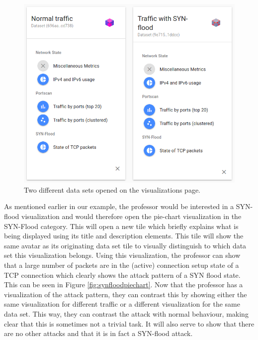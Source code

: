 \begin{figure}
    \centering
    \includegraphics[width=13cm]{images/evaluation-dataset-tiles.png}
    \caption{Two different data sets opened on the visualizations page.}
    \label{fig:datasettiles}
\end{figure}
As mentioned earlier in our example, the professor would be interested in a SYN-flood visualization and would therefore open the pie-chart visualization in the SYN-Flood category. This will open a new tile which briefly explains what is being displayed using its title and description elements. This tile will show the same avatar as its originating data set tile to visually distinguish to which data set this visualization belongs. Using this visualization, the professor can show that a large number of packets are in the (active) connection setup state of a TCP connection which clearly shows the attack pattern of a SYN flood state. This can be seen in Figure \ref{fig:synfloodpiechart}. Now that the professor has a visualization of the attack pattern, they can contrast this by showing either the same visualization for different traffic or a different visualization for the same data set. This way, they can contrast the attack with normal behaviour, making clear that this is sometimes not a trivial task. It will also serve to show that there are no other attacks and that it is in fact a SYN-flood attack.

